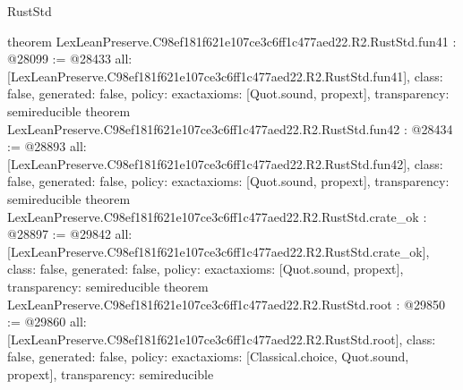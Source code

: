 \begin{lexlean}{RustStd}
\begin{coremodule}
{}
theorem LexLeanPreserve.C98ef181f621e107ce3c6ff1c477aed22.R2.RustStd.fun41 : @28099 := @28433 {
  all: [LexLeanPreserve.C98ef181f621e107ce3c6ff1c477aed22.R2.RustStd.fun41],
  class: false,
  generated: false,
  policy: exact{axioms: [Quot.sound, propext]},
  transparency: semireducible
}
theorem LexLeanPreserve.C98ef181f621e107ce3c6ff1c477aed22.R2.RustStd.fun42 : @28434 := @28893 {
  all: [LexLeanPreserve.C98ef181f621e107ce3c6ff1c477aed22.R2.RustStd.fun42],
  class: false,
  generated: false,
  policy: exact{axioms: [Quot.sound, propext]},
  transparency: semireducible
}
theorem LexLeanPreserve.C98ef181f621e107ce3c6ff1c477aed22.R2.RustStd.crate_ok : @28897 := @29842 {
  all: [LexLeanPreserve.C98ef181f621e107ce3c6ff1c477aed22.R2.RustStd.crate_ok],
  class: false,
  generated: false,
  policy: exact{axioms: [Quot.sound, propext]},
  transparency: semireducible
}
theorem LexLeanPreserve.C98ef181f621e107ce3c6ff1c477aed22.R2.RustStd.root : @29850 := @29860 {
  all: [LexLeanPreserve.C98ef181f621e107ce3c6ff1c477aed22.R2.RustStd.root],
  class: false,
  generated: false,
  policy: exact{axioms: [Classical.choice, Quot.sound, propext]},
  transparency: semireducible
}


\end{coremodule}
\end{lexlean}
